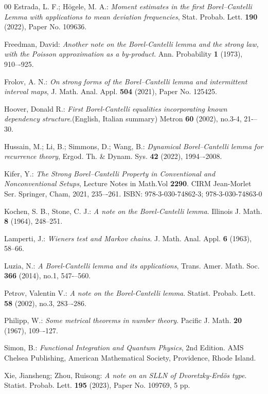 \documentclass{article}
\numberwithin{equation}{section}
\begin{document}
\begin{thebibliography}{00}
 Estrada, L. F.; H\"{o}gele, M. A.:
{\em Moment estimates in the first Borel–Cantelli Lemma with applications to mean deviation frequencies},
Stat. Probab. Lett. \textbf{190} (2022), Paper No. 109636.

 Freedman, David:
{\em Another note on the Borel-Cantelli lemma and the strong law, with the Poisson approximation as a by-product}.
Ann. Probability \textbf{1} (1973), 910–-925.

 Frolov, A. N.:
{\em On strong forms of the Borel–Cantelli lemma and intermittent interval maps},
J. Math. Anal. Appl. \textbf{504} (2021), Paper No. 125425.

 Hoover, Donald R.:
{\em First Borel-Cantelli equalities incorporating known dependency structure}.(English, Italian summary)
Metron \textbf{60} (2002), no.3-4, 21-–30.

 Hussain, M.; Li, B.; Simmons, D.; Wang, B.:
{\em Dynamical Borel–Cantelli lemma for recurrence theory},
Ergod. Th. \& Dynam. Sys. \textbf{42} (2022), 1994–-2008.

 Kifer, Y.:
{\em The Strong Borel–Cantelli Property in Conventional and Nonconventional Setups},
Lecture Notes in Math.Vol \textbf{2290}. CIRM Jean-Morlet Ser. Springer, Cham, 2021, 235–-261.
ISBN: 978-3-030-74862-3; 978-3-030-74863-0


 Kochen, S. B., Stone, C. J.:
{\em A note on the Borel-Cantelli lemma}. 
Illinois J. Math. \textbf{8} (1964), 248--251. 

 Lamperti, J.: 
{\em Wieners test and Markov chains}. 
J. Math. Anal. Appl. \textbf{6} (1963), 58--66.

 Luzia, N.:
{\em A Borel-Cantelli lemma and its applications},
Trans. Amer. Math. Soc. \textbf{366} (2014), no.1, 547-–560.

 Petrov, Valentin V.:
{\em A note on the Borel-Cantelli lemma}.
Statist. Probab. Lett. \textbf{58} (2002), no.3, 283–-286.

 Philipp, W.:
{\em Some metrical theorems in number theory}. 
Pacific J. Math. \textbf{20} (1967), 109–-127.

 Simon, B.:
{\it Functional Integration and Quantum Physics},
2nd Edition. AMS Chelsea Publishing, American Mathematical Society, Providence,
Rhode Island.

 Xie, Jiansheng; Zhou, Ruisong:
{\em A note on an SLLN of Dvoretzky-Erdös type}.
Statist. Probab. Lett. \textbf{195} (2023), Paper No. 109769, 5 pp.


\end{thebibliography}
\end{document}
